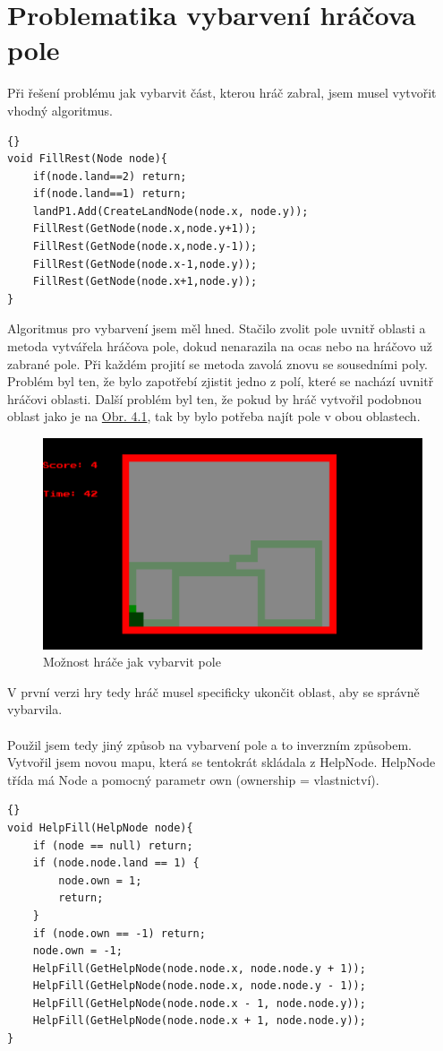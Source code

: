 \documentclass[12pt,a4paper]{report}
\begin{document}
\section{Problematika vybarvení hráčova pole}
Při řešení problému jak vybarvit část, kterou hráč zabral, jsem musel vytvořit vhodný algoritmus.
\begin{lstlisting}[]{}
void FillRest(Node node){
    if(node.land==2) return;
    if(node.land==1) return;
    landP1.Add(CreateLandNode(node.x, node.y));
    FillRest(GetNode(node.x,node.y+1));
    FillRest(GetNode(node.x,node.y-1));
    FillRest(GetNode(node.x-1,node.y));
    FillRest(GetNode(node.x+1,node.y));
}  
\end{lstlisting}
Algoritmus pro vybarvení jsem měl hned. 
Stačilo zvolit pole uvnitř oblasti a metoda vytvářela hráčova pole, dokud nenarazila na ocas nebo na hráčovo už zabrané pole.
Při každém projití se metoda zavolá znovu se sousedními poly.
Problém byl ten, že bylo zapotřebí zjistit jedno z polí, které se nachází uvnitř hráčovi oblasti.
Další problém byl ten, že pokud by hráč vytvořil podobnou oblast jako je na \hyperref[fig:dvepole]{Obr. 4.1}, tak by bylo potřeba najít pole v obou oblastech. 
\begin{figure}[H]\centering
    \includegraphics[width=\textwidth]{images/dvepole.png}
    \caption{Možnost hráče jak vybarvit pole}
    \label{fig:dvepole}
\end{figure}
V první verzi hry tedy hráč musel specificky ukončit oblast, aby se správně vybarvila.
\\\\
Použil jsem tedy jiný způsob na vybarvení pole a to inverzním způsobem.
Vytvořil jsem novou mapu, která se tentokrát skládala z HelpNode.
HelpNode třída má Node a pomocný parametr own (ownership = vlastnictví).
\begin{lstlisting}[]{}
void HelpFill(HelpNode node){
    if (node == null) return;
    if (node.node.land == 1) {
        node.own = 1;
        return;
    }
    if (node.own == -1) return;
    node.own = -1;
    HelpFill(GetHelpNode(node.node.x, node.node.y + 1));
    HelpFill(GetHelpNode(node.node.x, node.node.y - 1));
    HelpFill(GetHelpNode(node.node.x - 1, node.node.y));
    HelpFill(GetHelpNode(node.node.x + 1, node.node.y));
}
\end{lstlisting}
\end{document}
